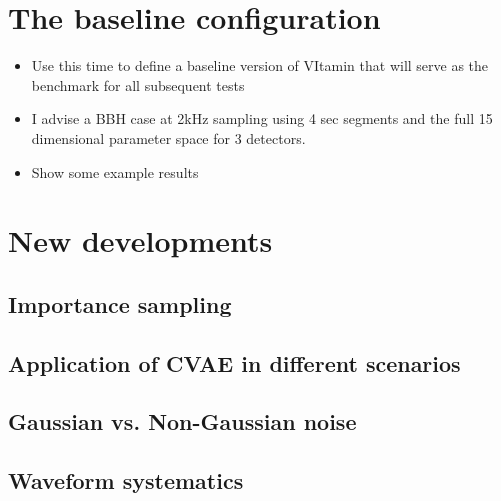 \documentclass[%
showpacs,
 amsmath,amssymb,
 aps,
 twocolumn,
 prl,
 reprint,
floatfix,
]{revtex4-1}
\begin{document}
\section{The baseline configuration}

\begin{itemize}
\item Use this time to define a baseline version of VItamin that will serve as
the benchmark for all subsequent tests
\item I advise a BBH case at 2kHz sampling using 4 sec segments and the full 15
dimensional parameter space for 3 detectors.
\item Show some example results
\end{itemize}

\section{New developments}

\subsection{Importance sampling}

\subsection{Application of CVAE in different scenarios}

\subsection{Gaussian vs. Non-Gaussian noise}

\subsection{Waveform systematics}
\end{document}

